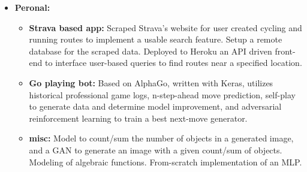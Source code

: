 \documentclass[a4paper,10pt,notitlepage]{article}
\begin{document}
\begin{itemize}
        \vspace{-5pt}\item \textbf{Peronal:} 
            \begin{itemize}
                \item \textbf{Strava based app:} Scraped Strava's website for user created cycling and running routes to implement a usable search feature. Setup a remote database for the scraped data. Deployed to Heroku an API driven front-end to interface user-based queries to find routes near a specified location.
                \item \textbf{Go playing bot:} Based on AlphaGo, written with Keras, utilizes historical professional game logs, n-step-ahead move prediction, self-play to generate data and determine model improvement, and adversarial reinforcement learning to train a best next-move generator.
                \item \textbf{misc:} Model to count/sum the number of objects in a generated image, and a GAN to generate an image with a given count/sum of objects. Modeling of algebraic functions. From-scratch implementation of an MLP.
            \end{itemize}
    \end{itemize}
\end{document}
